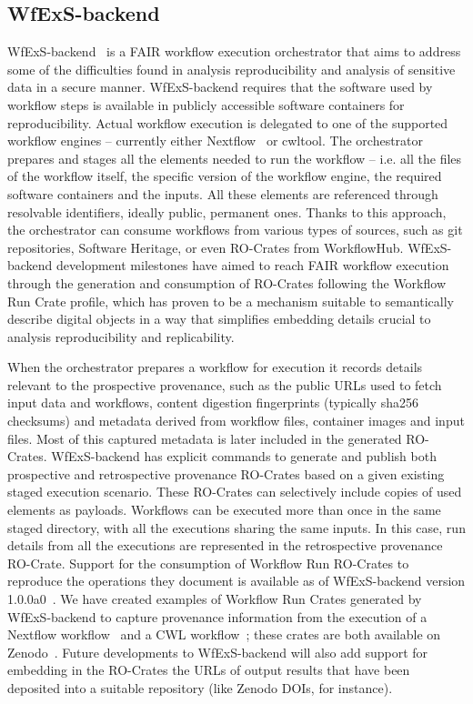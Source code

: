 \subsection{WfExS-backend}\label{wrroc:wfexs}

WfExS-backend~\cite{Fernandez 2024a} is a FAIR workflow execution orchestrator that aims to address some of the difficulties found in analysis reproducibility and analysis of sensitive data in a secure manner.
WfExS-backend requires that the software used by workflow steps is available in publicly accessible software containers for reproducibility.
Actual workflow execution is delegated to one of the supported workflow engines -- currently either Nextflow~\cite{Di Tommaso 2017} or cwltool.
The orchestrator prepares and stages all the elements needed to run the workflow -- i.e. all the files of the workflow itself, the specific version of the workflow engine, the required software containers and the inputs.
All these elements are referenced through resolvable identifiers, ideally public, permanent ones.
Thanks to this approach, the orchestrator can consume workflows from various types of sources, such as git repositories, Software Heritage, or even RO-Crates from WorkflowHub.
%
WfExS-backend development milestones have aimed to reach FAIR workflow execution through the generation and consumption of RO-Crates following the Workflow Run Crate profile, which has proven to be a mechanism suitable to semantically describe digital objects in a way that simplifies embedding details crucial to analysis reproducibility and replicability.

When the orchestrator prepares a workflow for execution it records details relevant to the prospective provenance, such as the public URLs used to fetch input data and workflows, content digestion fingerprints (typically sha256 checksums) and metadata derived from workflow files, container images and input files.
Most of this captured metadata is later included in the generated RO-Crates. WfExS-backend has explicit commands to generate and publish both prospective and retrospective provenance RO-Crates based on a given existing staged execution scenario.
These RO-Crates can selectively include copies of used elements as payloads.
Workflows can be executed more than once in the same staged directory, with all the executions sharing the same inputs.
In this case, run details from all the executions are represented in the retrospective provenance RO-Crate. Support for the consumption of Workflow Run RO-Crates to reproduce the operations they document is available as of WfExS-backend version 1.0.0a0~\cite{Fernandez 2024a}.
%
We have created examples of Workflow Run Crates generated by WfExS-backend to capture provenance information from the execution of a Nextflow workflow~\cite{Bouyssie 2023} and a CWL workflow~\cite{Amstutz 2023}; these crates are both available on Zenodo~\cite{Fernandez 2024b, Fernandez 2024c}.
%
Future developments to WfExS-backend will also add support for embedding in the RO-Crates the URLs of output results that have been deposited into a suitable repository (like Zenodo DOIs, for instance).

